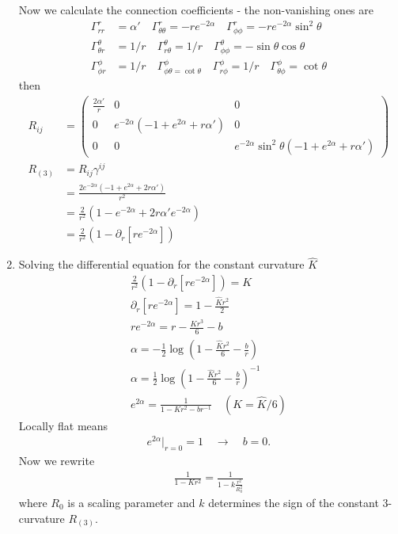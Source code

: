 \documentclass[10pt,a4paper]{article}
\theoremstyle{definition}
\begin{document}
\begin{enumerate}
\begin{itemize}
\end{itemize}
Now we calculate the connection coefficients - the non-vanishing ones are
\begin{align}
\Gamma^r_{rr}&=\alpha'\quad\Gamma^r_{\theta\theta}=-re^{-2\alpha}\quad\Gamma^r_{\phi\phi}=-re^{-2\alpha}\sin^2\theta\\
\Gamma^\theta_{\theta r}&=1/r\quad\Gamma^\theta_{r\theta}=1/r\quad\Gamma^\theta_{\phi\phi}=-\sin\theta\cos\theta\\
\Gamma^\phi_{\phi r}&=1/r\quad\Gamma^\phi_{\phi\theta=\cot\theta}\quad\Gamma^\phi_{r\phi}=1/r\quad\Gamma^\phi_{\theta\phi}=\cot\theta
\end{align}
then
\begin{align}
R_{ij}&=\left(\begin{array}{ccc}
\frac{2\alpha'}{r} & 0 & 0\\
0 & e^{-2\alpha}(-1+e^{2\alpha}+r\alpha') & 0\\
0 & 0 & e^{-2\alpha}\sin^2\theta(-1+e^{2\alpha}+r\alpha')
\end{array}
\right)\\
R_{(3)}&=R_{ij}\gamma^{ij}\\
&=\frac{2e^{-2\alpha}(-1+e^{2\alpha}+2r\alpha')}{r^2}\\
&=\frac{2}{r^2}(1-e^{-2\alpha}+2r\alpha'e^{-2\alpha})\\
&=\frac{2}{r^2}(1-\partial_r[re^{-2\alpha}])
\end{align}
\item Solving the differential equation for the constant curvature $\hat{K}$
\begin{align}
\frac{2}{r^2}(1-\partial_r[re^{-2\alpha}])=K\\
\partial_r[re^{-2\alpha}]=1-\frac{\hat{K}r^2}{2}\\
re^{-2\alpha}=r-\frac{Kr^3}{6}-b\\
\alpha=-\frac{1}{2}\log\left(1-\frac{\hat{K}r^2}{6}-\frac{b}{r}\right)\\
\alpha=\frac{1}{2}\log\left(1-\frac{\hat{K}r^2}{6}-\frac{b}{r}\right)^{-1}\\
e^{2\alpha}=\frac{1}{1-Kr^2-br^{-1}} \quad(K=\hat{K}/6)
\end{align}
Locally flat means
\begin{align}
e^{2\alpha}|_{r=0}=1 \quad\rightarrow\quad b=0.
\end{align}
Now we rewrite
\begin{align}
\frac{1}{1-Kr^2}=\frac{1}{1-k\frac{r^2}{R_0^2}}
\end{align}
where $R_0$ is a scaling parameter and $k$ determines the sign of the constant 3-curvature $R_{(3)}$.

\end{enumerate}
\end{document}
